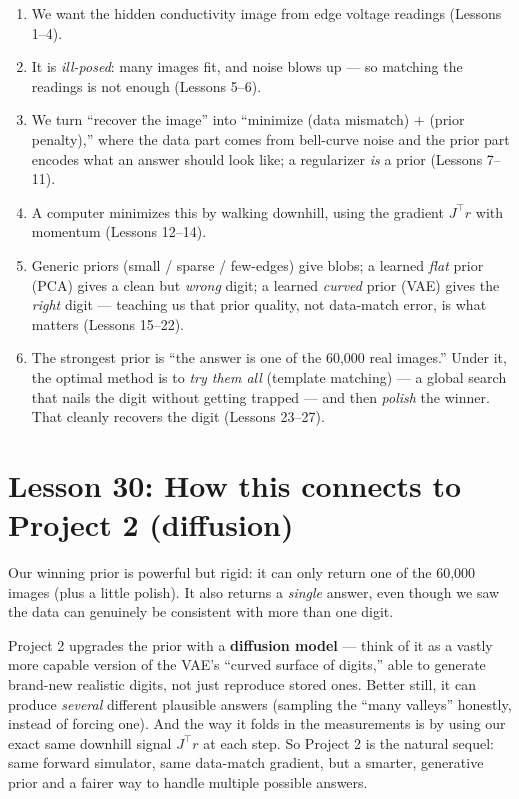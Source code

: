 \documentclass[11pt]{article}
\begin{document}
\begin{enumerate}[leftmargin=2em]
\item We want the hidden conductivity image from edge voltage readings
(Lessons 1--4).
\item It is \emph{ill-posed}: many images fit, and noise blows up --- so
matching the readings is not enough (Lessons 5--6).
\item We turn ``recover the image'' into ``minimize (data mismatch) $+$
(prior penalty),'' where the data part comes from bell-curve noise and the
prior part encodes what an answer should look like; a regularizer \emph{is} a
prior (Lessons 7--11).
\item A computer minimizes this by walking downhill, using the gradient
$J^\top r$ with momentum (Lessons 12--14).
\item Generic priors (small / sparse / few-edges) give blobs; a learned
\emph{flat} prior (PCA) gives a clean but \emph{wrong} digit; a learned
\emph{curved} prior (VAE) gives the \emph{right} digit --- teaching us that
prior quality, not data-match error, is what matters
(Lessons 15--22).
\item The strongest prior is ``the answer is one of the 60{,}000 real
images.'' Under it, the optimal method is to \emph{try them all} (template
matching) --- a global search that nails the digit without getting trapped ---
and then \emph{polish} the winner. That cleanly recovers the digit
(Lessons 23--27).
\end{enumerate}

\section{Lesson 30: How this connects to Project 2 (diffusion)}

Our winning prior is powerful but rigid: it can only return one of the
60{,}000 images (plus a little polish). It also returns a \emph{single} answer,
even though we saw the data can genuinely be consistent with more than one
digit.

Project 2 upgrades the prior with a \textbf{diffusion model} --- think of it as
a vastly more capable version of the VAE's ``curved surface of digits,'' able
to generate brand-new realistic digits, not just reproduce stored ones. Better
still, it can produce \emph{several} different plausible answers (sampling the
``many valleys'' honestly, instead of forcing one). And the way it folds in the
measurements is by using our exact same downhill signal $J^\top r$ at each
step. So Project 2 is the natural sequel: same forward simulator, same
data-match gradient, but a smarter, generative prior and a fairer way to
handle multiple possible answers.
\end{document}
